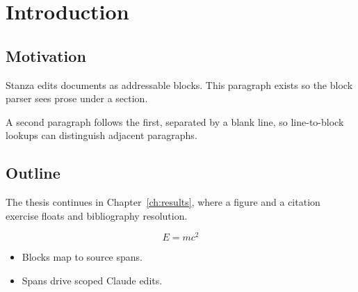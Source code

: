 \chapter{Introduction}
\label{ch:intro}

\section{Motivation}

Stanza edits  documents as addressable blocks. This
paragraph exists so the block parser sees prose under a section.

A second paragraph follows the first, separated by a blank line, so
line-to-block lookups can distinguish adjacent paragraphs.

\section{Outline}

The thesis continues in Chapter~\ref{ch:results}, where a figure and
a citation exercise floats and bibliography resolution.

\begin{equation}
  \label{eq:energy}
  E = mc^2
\end{equation}

\begin{itemize}
  \item Blocks map to source spans.
  \item Spans drive scoped Claude edits.
\end{itemize}
